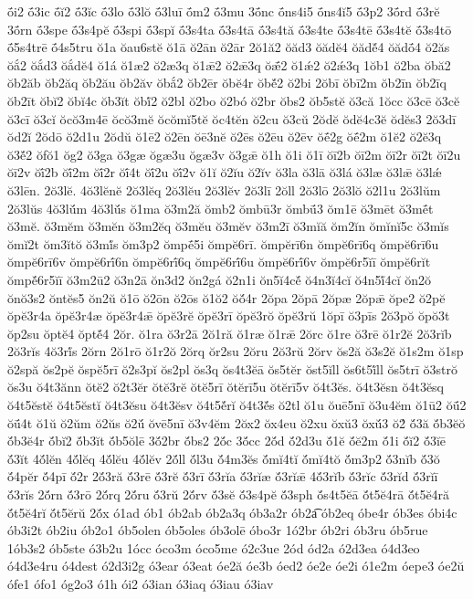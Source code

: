 {ṓi2
ṓ3ic
ṓĭ2
ṓ3ĭc
ṓ3lo
ṓ3lŏ
ṓ3luī
ṓm2
ṓ3mu
3ṓnc
ṓns4i5
ṓns4ĭ5
ṓ3p2
3ṓrd
ṓ3rĕ
3ṓrn
ṓ3spe
ṓ3s4pĕ
ṓ3spi
ṓ3spĭ
ṓ3s4ta
ṓ3s4tā
ṓ3s4tă
ṓ3s4te
ṓ3s4tē
ṓ3s4tĕ
ṓ3s4tō
ṓ5s4trē
ṓ4s5tru
ŏ1a
ŏau6stĕ
ŏ1ā
ŏ2ān
ŏ2ār
2ŏ1ă2
ŏăd3
ŏădĕ4
ŏădĕ́4
ŏădṓ4
ŏ2ăs
ŏắ2
ŏắd3
ŏắdĕ4
ŏ1á
ŏ1æ2
ŏ2æ3q
ŏ1ǣ2
ŏ2ǣ3q
ŏǣ́2
ŏ1ǽ2
ŏ2ǽ3q
1ŏb1
ŏ2ba
ŏbă2
ŏb2ăb
ŏb2ăq
ŏb2ău
ŏb2ăv
ŏbắ2
ŏb2ēr
ŏbĕ4r
ŏbĕ́2
ŏ2bi
2ŏbī
ŏbī2m
ŏb2īn
ŏb2īq
ŏb2īt
ŏbĭ2
ŏbĭ4c
ŏb3ĭt
ŏbĭ́2
ŏ2bl
ŏ2bo
ŏ2bó
ŏ2br
ŏbs2
ŏb5stĕ
ŏ3că
1ŏcc
ŏ3cē
ŏ3cĕ
ŏ3cī
ŏ3cĭ
ŏcŏ3m4ē
ŏcŏ3mĕ
ŏcŏmĭ5tĕ
ŏc4tĕn
ŏ2cu
ŏ3cŭ
2ŏdĕ
ŏdĕ4c3ĕ
ŏdĕs3
2ŏ3dī
ŏd2ĭ
2ŏdō
ŏ2d1u
2ŏdŭ
ŏ1ē2
ŏ2ēn
ŏē3nĕ
ŏ2ēs
ŏ2ēu
ŏ2ēv
ŏḗ2g
ŏḗ2m
ŏ1ĕ2
ŏ2ĕ3q
ŏ3ĕ́2
ŏfŏ1
ŏg2
ŏ3ga
ŏ3gæ
ŏgæ3u
ŏgæ3v
ŏ3gǣ
ŏ1h
ŏ1i
ŏ1ī
ŏī2b
ŏī2m
ŏī2r
ŏī2t
ŏī2u
ŏī2v
ŏī́2b
ŏī́2m
ŏī́2r
ŏī́4t
ŏī́2u
ŏī́2v
ŏ1ĭ
ŏ2ĭu
ŏ2ĭv
ŏ3la
ŏ3lā
ŏ3lá
ŏ3læ
ŏ3lǣ
ŏ3lǽ
ŏ3lēn.
2ŏ3lĕ.
4ŏ3lĕnĕ
2ŏ3lĕq
2ŏ3lĕu
2ŏ3lĕv
2ŏ3lī
2ŏll
2ŏ3lō
2ŏ3lŏ
ŏ2l1u
2ŏ3lŭm
2ŏ3lŭs
4ŏ3lŭ́m
4ŏ3lŭ́s
ŏ1ma
ŏ3m2ă
ŏmb2
ŏmbū3r
ŏmbū́3
ŏm1ē
ŏ3mēt
ŏ3mḗt
ŏ3mĕ.
ŏ3mĕm
ŏ3mĕn
ŏ3m2ĕq
ŏ3mĕu
ŏ3mĕv
ŏ3m2ī
ŏ3mĭă
ŏm2ĭn
ŏmĭnĭ5c
ŏ3mĭs
ŏmĭ2t
ŏm3ĭtŏ
ŏ3mĭ́s
ŏm3p2
ŏmpḗ5i
ŏmpĕ6rī.
ŏmpĕrī6n
ŏmpĕ6rī6q
ŏmpĕ6rī6u
ŏmpĕ6rī6v
ŏmpĕ6rī́6n
ŏmpĕ6rī́6q
ŏmpĕ6rī́6u
ŏmpĕ6rī́6v
ŏmpĕ6r5ĭī
ŏmpĕ6rĭt
ŏmpĕ́6r5ĭī
ŏ3m2ū2
ŏ3n2ā
ŏn3d2
ŏn2gá
ŏ2n1i
ŏn5ĭ4cĕ́
ŏ4n3ĭ4cĭ
ŏ4n5ĭ́4cĭ
ŏn2ŏ
ŏnŏ3s2
ŏntĕs5
ŏn2ŭ
ŏ1ō
ŏ2ōn
ŏ2ōs
ŏ1ŏ2
ŏŏ́4r
2ŏpa
2ŏpā
2ŏpæ
2ŏpǣ
ŏpe2
ŏ2pĕ
ŏpĕ3r4a
ŏpĕ3r4æ
ŏpĕ3r4ǣ
ŏpĕ3rĕ
ŏpĕ3rī
ŏpĕ3rŏ
ŏpĕ3rŭ
1ŏpī
ŏ3pīs
2ŏ3pŏ
ŏpŏ3t
ŏp2su
ŏptĕ4
ŏptĕ́4
2ŏr.
ŏ1ra
ŏ3r2ā
2ŏ1ră
ŏ1ræ
ŏ1rǣ
2ŏrc
ŏ1re
ŏ3rē
ŏ1r2ĕ
2ŏ3rĭb
2ŏ3rĭs
4ŏ3rĭ́s
2ŏrn
2ŏ1rō
ŏ1r2ŏ
2ŏrq
ŏr2su
2ŏru
2ŏ3rŭ
2ŏrv
ŏs2ă
ŏ3s2ĕ
ŏ1s2m
ŏ1sp
ŏ2spă
ŏs2pĕ
ŏspĕ5rī
ŏ2s3pĭ
ŏs2pl
ŏs3q
ŏs4t3ĕā
ŏs5tĕr
ŏst5ĭll
ŏs6t5ĭ́ll
ŏs5trī
ŏ3strŏ
ŏs3u
ŏ4t3ănn
ŏtĕ2
ŏ2t3ĕr
ŏtĕ3rĕ
ŏtĕ5rī
ŏtĕrī5u
ŏtĕrī5v
ŏ4t3ĕs.
ŏ4t3ĕsn
ŏ4t3ĕsq
ŏ4t5ĕstĕ
ŏ4t5ĕstĭ
ŏ4t3ĕsu
ŏ4t3ĕsv
ŏ4t5ĕ́rĭ
ŏ4t3ĕ́s
ŏ2tl
ŏ1u
ŏuē5nī
ŏ3u4ĕm
ŏ1ū2
ŏū́2
ŏū́4t
ŏ1ŭ
ŏ2ŭm
ŏ2ŭs
ŏ2ŭ́
ŏvē5nī
ŏ3v4ĕm
2ŏx2
ŏx4eu
ŏ2xu
ŏxŭ3
ŏxŭ́3
ŏ2́
ŏ́3ă
ŏ́b3ĕŏ
ŏ́b3ĕ4r
ŏ́bĭ2
ŏ́b3ĭt
ŏ́b5ŏlē
3ŏ́2br
ŏ́bs2
2ŏ́c
3ŏ́cc
2ŏ́d
ŏ́2d3u
ŏ́1ĕ
ŏ́ĕ2m
ŏ́1i
ŏ́ĭ2
ŏ́3ĭē
ŏ́3ĭt
4ŏ́lĕn
4ŏ́lĕq
4ŏ́lĕu
4ŏ́lĕv
2ŏ́ll
ŏ́l3u
ŏ́4m3ĕs
ŏ́mĭ4tĭ
ŏ́mĭ4tŏ
ŏ́m3p2
ŏ́3nĭb
ŏ́3ŏ
ŏ́4pĕr
ŏ́4pī
ŏ́2r
2ŏ́3ră
ŏ́3rē
ŏ́3rĕ
ŏ́3rī
ŏ́3rĭa
ŏ́3rĭæ
ŏ́3rĭǣ
4ŏ́3rĭb
ŏ́3rĭc
ŏ́3rĭd
ŏ́3rĭī
ŏ́3rĭs
2ŏ́rn
ŏ́3rō
2ŏ́rq
2ŏ́ru
ŏ́3rŭ
2ŏ́rv
ŏ́3sĕ
ŏ́3s4pĕ
ŏ́3sph
ŏ́s4t5ĕā
ŏ́t5ĕ4rā
ŏ́t5ĕ4ră
ŏ́t5ĕ4rĭ
ŏ́t5ĕrŭ
2ŏ́x
ó1ad
ób1
ób2ab
ób2a3q
ób3a2r
ób2a͡
ób2eq
óbe4r
ób3es
óbi4c
ób3i2t
ób2iu
ób2o1
ób5olen
ób5oles
ób3olē
óbo3r
1ó2br
ób2ri
ób3ru
ób5rue
1ób3s2
ób5ste
ó3b2u
1ócc
óco3m
óco5me
ó2c3ue
2ód
ód2a
ó2d3ea
ó4d3eo
ó4d3e4ru
ó4dest
ó2d3i2g
ó3ear
ó3eat
óe2ă
óe3b
óed2
óe2e
óe2i
ó1e2m
óepe3
óe2ŭ
ófe1
ófo1
óg2o3
ó1h
ói2
ó3ian
ó3iaq
ó3iau
ó3iav
}
